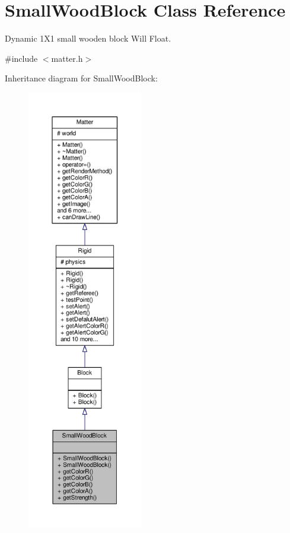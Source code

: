 \hypertarget{classSmallWoodBlock}{}\section{Small\+Wood\+Block Class Reference}
\label{classSmallWoodBlock}


Dynamic 1\+X1 small wooden block Will Float.  




{\ttfamily \#include $<$matter.\+h$>$}



Inheritance diagram for Small\+Wood\+Block\+:\nopagebreak
\begin{figure}[H]
\begin{center}
\leavevmode
\includegraphics[height=550pt]{classSmallWoodBlock__inherit__graph}
\end{center}
\end{figure}



